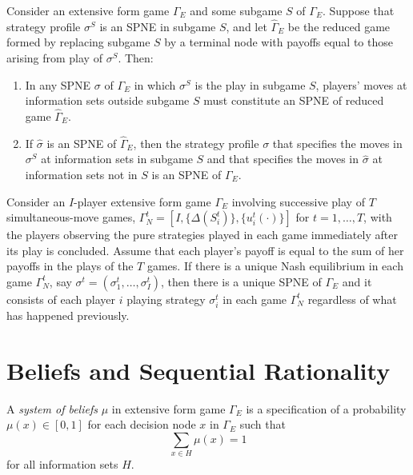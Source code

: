 \begin{prop}
    Consider an extensive form game $\Gamma_E$ and some subgame $S$ of $\Gamma_E$. Suppose that strategy profile $\sigma^S$ is an SPNE in subgame $S$, and let $\hat{\Gamma}_E$ be the reduced game formed by replacing subgame $S$ by a terminal node with payoffs equal to those arising from play of $\sigma^S$. Then:
    \begin{enumerate}
        \item In any SPNE $\sigma$ of $\Gamma_E$ in which $\sigma^S$ is the play in subgame $S$, players' moves at information sets outside subgame $S$ must constitute an SPNE of reduced game $\hat{\Gamma}_E$.
        \item If $\hat{\sigma}$ is an SPNE of $\hat{\Gamma}_E$, then the strategy profile $\sigma$ that specifies the moves in $\sigma^S$ at information sets in subgame $S$ and that specifies the moves in $\hat{\sigma}$ at information sets not in $S$ is an SPNE of $\Gamma_E$.
    \end{enumerate}
\end{prop}

\begin{prop}
    Consider an $I$-player extensive form game $\Gamma_E$ involving successive play of $T$ simultaneous-move games, $\Gamma_N^t = [I, \{\Delta(S_i^t)\}, \{u_i^t(\cdot)\}]$ for $t = 1, \dots, T$, with the players observing the pure strategies played in each game immediately after its play is concluded. Assume that each player's payoff is equal to the sum of her payoffs in the plays of the $T$ games. If there is a unique Nash equilibrium in each game $\Gamma_N^t$, say $\sigma^t = (\sigma_1^t, \dots, \sigma_I^t)$, then there is a unique SPNE of $\Gamma_E$ and it consists of each player $i$ playing strategy $\sigma_i^t$ in each game $\Gamma_N^t$ regardless of what has happened previously.
\end{prop}


\section{Beliefs and Sequential Rationality}

\begin{defn}
    A \emph{system of beliefs} $\mu$ in extensive form game $\Gamma_E$ is a specification of a probability $\mu(x) \in [0, 1]$ for each decision node $x$ in $\Gamma_E$ such that 
    \begin{equation*}
        \sum_{x \in H} \mu (x) = 1
    \end{equation*}
    for all information sets $H$.
\end{defn}

